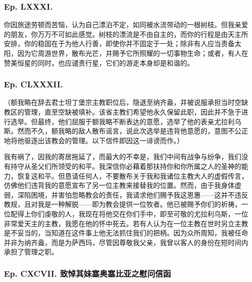 
\subsubsection{Ep. LXXXI.}

你因旅途劳顿而苦恼，认为自己漂泊不定，如同被水流带动的一根树枝。但我亲爱的朋友，你万万不可如此感觉。树枝的漂流是不由自主的，而你的行程是由天主所安排，你的稳固在于为他人行善，即使你并不固定于一处；除非有人应当责备太阳，因为它周游世界，散布光芒，并赐予它所照耀的一切事物生命；或者，有人在赞美恒星的同时，也应谴责行星，它们的游走本身却是和谐的。\par


\subsubsection{Ep. CLXXXII.}

（额我略在辞去君士坦丁堡宗主教职位后，隐退至纳齐盎，并被说服承担当时空缺教区的管理，直至空缺被填补。该省主教们希望他永久保留此职，因此并不急于进行选举。但最终，他们屈服于额我略不断表达的意愿，选举了他的表亲尤拉利乌斯。然而不久，额我略的敌人散布谣言，说此次选举是违背他意愿的，意图不公正地将他驱逐出该教会的管理。以下信件即因这一诽谤而作。）\par

我有祸了，因我的寄居拖延了，而最大的不幸是，我们中间有战争与纷争，我们没有持守从圣父们所领受的和平。我深信你必藉着那扶持你和你所属之人的圣神的能力，恢复这和平。但恳请任何人，不要散布关于我和我诸位主教大人的虚假传言，仿佛他们违背我的意愿宣布了另一位主教来接替我的位置。然而，由于我身体虚弱，深陷困境，并害怕忽略教会的责任，我请求他们赐予我这恩惠——这并不违反教规，且对我是一种解脱——即为教会提供一位牧者。他已被赐予你们的祈祷，一位配得上你们虔敬的人，我现在将他交在你们手中，即至可敬的尤拉利乌斯，一位非常爱天主的主教，我愿在他的怀中死去。若有人认为在一位主教在世时另立主教是不妥当的，当知道在这件事上他无法抓住我们的把柄。因为众所周知，我被任命并非为纳齐盎，而是为萨西玛，尽管因尊敬我父亲，我曾以客人的身份在短时间内承担了管理之职。\par


\subsubsection{Ep. CXCVII. 致悼其妹塞奥塞比亚之慰问信函}

